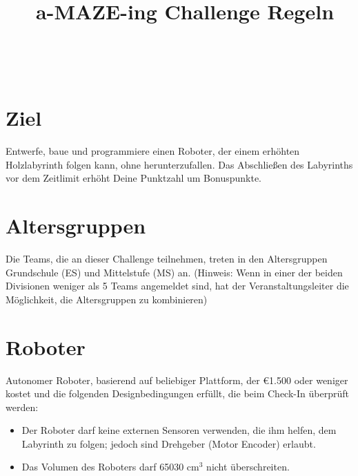 \documentclass[a4paper,12pt]{article}
\begin{document}


\title{\tagYear\ a-MAZE-ing Challenge Regeln}

\makeatletter
\let\inserttitle\@title
\makeatother
\begin{center}
	\rrgerLogo
	\huge                      %
	\bfseries                   %
	\\
	\inserttitle
\end{center}
\section{Ziel}
Entwerfe, baue und programmiere einen Roboter, der einem erhöhten Holzlabyrinth
folgen kann, ohne herunterzufallen. Das Abschließen des Labyrinths vor dem
Zeitlimit erhöht Deine Punktzahl um Bonuspunkte.

\section{Altersgruppen}
Die Teams, die an dieser Challenge teilnehmen, treten in den Altersgruppen
Grundschule (ES) und Mittelstufe (MS) an. (Hinweis: Wenn in einer der beiden
Divisionen weniger als 5 Teams angemeldet sind, hat der Veranstaltungsleiter
die Möglichkeit, die Altersgruppen zu kombinieren)

\section{Roboter}
Autonomer Roboter, basierend auf beliebiger Plattform, der \euro{1.500}  oder
weniger kostet und die folgenden Designbedingungen erfüllt, die beim Check-In
überprüft werden:
\begin{itemize}
	\item Der Roboter darf keine externen Sensoren verwenden, die ihm
		helfen, dem Labyrinth zu folgen; jedoch sind Drehgeber (Motor
		Encoder) erlaubt.
	\item Das Volumen des Roboters darf 65030 cm$^{3}$ nicht überschreiten.
\end{itemize}
\end{document}
